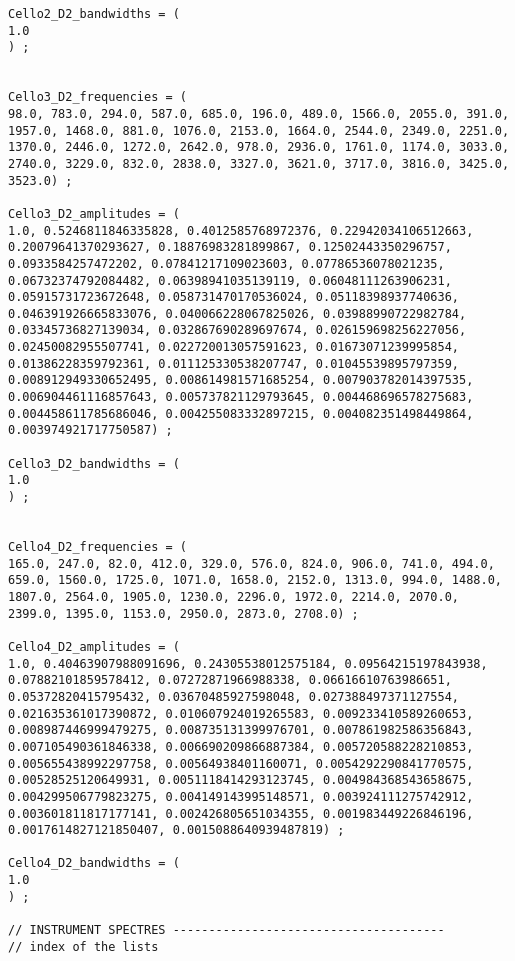 \begin{lstlisting}
Cello2_D2_bandwidths = (
1.0
) ;  


Cello3_D2_frequencies = (
98.0, 783.0, 294.0, 587.0, 685.0, 196.0, 489.0, 1566.0, 2055.0, 391.0, 1957.0, 1468.0, 881.0, 1076.0, 2153.0, 1664.0, 2544.0, 2349.0, 2251.0, 1370.0, 2446.0, 1272.0, 2642.0, 978.0, 2936.0, 1761.0, 1174.0, 3033.0, 2740.0, 3229.0, 832.0, 2838.0, 3327.0, 3621.0, 3717.0, 3816.0, 3425.0, 3523.0) ; 
 
Cello3_D2_amplitudes = (
1.0, 0.5246811846335828, 0.4012585768972376, 0.22942034106512663, 0.20079641370293627, 0.18876983281899867, 0.12502443350296757, 0.0933584257472202, 0.07841217109023603, 0.07786536078021235, 0.06732374792084482, 0.06398941035139119, 0.06048111263906231, 0.05915731723672648, 0.058731470170536024, 0.05118398937740636, 0.046391926665833076, 0.040066228067825026, 0.03988990722982784, 0.03345736827139034, 0.032867690289697674, 0.026159698256227056, 0.02450082955507741, 0.022720013057591623, 0.01673071239995854, 0.01386228359792361, 0.011125330538207747, 0.01045539895797359, 0.008912949330652495, 0.008614981571685254, 0.007903782014397535, 0.006904461116857643, 0.005737821129793645, 0.004468696578275683, 0.004458611785686046, 0.004255083332897215, 0.004082351498449864, 0.003974921717750587) ; 
 
Cello3_D2_bandwidths = (
1.0
) ; 


Cello4_D2_frequencies = (
165.0, 247.0, 82.0, 412.0, 329.0, 576.0, 824.0, 906.0, 741.0, 494.0, 659.0, 1560.0, 1725.0, 1071.0, 1658.0, 2152.0, 1313.0, 994.0, 1488.0, 1807.0, 2564.0, 1905.0, 1230.0, 2296.0, 1972.0, 2214.0, 2070.0, 2399.0, 1395.0, 1153.0, 2950.0, 2873.0, 2708.0) ; 
 
Cello4_D2_amplitudes = (
1.0, 0.40463907988091696, 0.24305538012575184, 0.09564215197843938, 0.07882101859578412, 0.07272871966988338, 0.06616610763986651, 0.05372820415795432, 0.03670485927598048, 0.027388497371127554, 0.021635361017390872, 0.010607924019265583, 0.009233410589260653, 0.008987446999479275, 0.008735131399976701, 0.007861982586356843, 0.007105490361846338, 0.006690209866887384, 0.005720588228210853, 0.005655438992297758, 0.00564938401160071, 0.0054292290841770575, 0.00528525120649931, 0.0051118414293123745, 0.004984368543658675, 0.004299506779823275, 0.004149143995148571, 0.003924111275742912, 0.003601811817177141, 0.002426805651034355, 0.001983449226846196, 0.0017614827121850407, 0.0015088640939487819) ; 
 
Cello4_D2_bandwidths = (
1.0
) ; 

// INSTRUMENT SPECTRES --------------------------------------
// index of the lists


\end{lstlisting}
